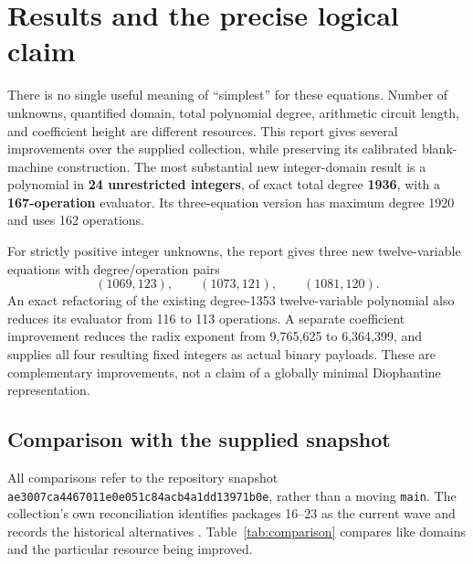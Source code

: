 \section{Results and the precise logical claim}
\label{sec:results}

There is no single useful meaning of ``simplest'' for these equations.
Number of unknowns, quantified domain, total polynomial degree, arithmetic
circuit length, and coefficient height are different resources.  This report
gives several improvements over the supplied collection, while preserving
its calibrated blank-machine construction.  The most substantial new
integer-domain result is a polynomial in \textbf{24 unrestricted integers},
of exact total degree \textbf{1936}, with a \textbf{167-operation} evaluator.
Its three-equation version has maximum degree 1920 and uses 162 operations.

For strictly positive integer unknowns, the report gives three new
twelve-variable equations with degree/operation pairs
\[
 (1069,123),\qquad (1073,121),\qquad (1081,120).
\]
An exact refactoring of the existing degree-1353 twelve-variable polynomial
also reduces its evaluator from 116 to 113 operations.  A separate
coefficient improvement reduces the radix exponent from 9,765,625 to
6,364,399, and supplies all four resulting fixed integers as actual binary
payloads.  These are complementary improvements, not a claim of a globally
minimal Diophantine representation.

\subsection{Comparison with the supplied snapshot}

All comparisons refer to the repository snapshot
\texttt{ae3007ca4467011e0e051c84acb4a1dd13971b0e}, rather than a moving
\texttt{main}.  The collection's own reconciliation identifies packages
16--23 as the current wave and records the historical alternatives
\cite{collection}.  Table~\ref{tab:comparison} compares like domains and
the particular resource being improved.

